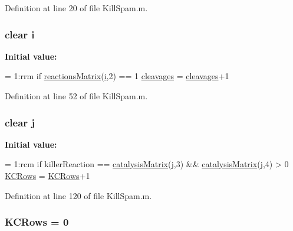 Definition at line 20 of file Kill\+Spam.\+m.

\hypertarget{a00029_ac870e1cd47f6d78f16a98a24c8392fcf}{
\subsubsection[{i}]{ clear i}}\label{a00029_ac870e1cd47f6d78f16a98a24c8392fcf}
{\bfseries Initial value\+:}
\begin{DoxyCode}
= 1:rrm
        \textcolor{keywordflow}{if} \hyperlink{a00029_ac52097a2745fcef31eb175d2e9485845}{reactionsMatrix}(\hyperlink{a00029_ac870e1cd47f6d78f16a98a24c8392fcf}{i},2) == 1
            \hyperlink{a00029_a89060c6979e5a4ff7b0985b35f295695}{cleavages} = \hyperlink{a00029_a89060c6979e5a4ff7b0985b35f295695}{cleavages}+1
\end{DoxyCode}


Definition at line 52 of file Kill\+Spam.\+m.

\hypertarget{a00029_ad34e9c7e9ae69ae0b9f1866faed5e4ad}{
\subsubsection[{j}]{\setlength{\rightskip}{0pt plus 5cm}clear j}}\label{a00029_ad34e9c7e9ae69ae0b9f1866faed5e4ad}
{\bfseries Initial value\+:}
\begin{DoxyCode}
= 1:rcm
                \textcolor{keywordflow}{if} killerReaction == \hyperlink{a00029_a0810027f58d6be965e44b7b84c44ace8}{catalysisMatrix}(\hyperlink{a00029_ad34e9c7e9ae69ae0b9f1866faed5e4ad}{j},3) && 
      \hyperlink{a00029_a0810027f58d6be965e44b7b84c44ace8}{catalysisMatrix}(\hyperlink{a00029_ad34e9c7e9ae69ae0b9f1866faed5e4ad}{j},4) > 0
                    \hyperlink{a00029_a62227634d3ceda9bf932c630583da2b9}{KCRows} = \hyperlink{a00029_a62227634d3ceda9bf932c630583da2b9}{KCRows}+1
\end{DoxyCode}


Definition at line 120 of file Kill\+Spam.\+m.

\hypertarget{a00029_a62227634d3ceda9bf932c630583da2b9}{
\subsubsection[{K\+C\+Rows}]{\setlength{\rightskip}{0pt plus 5cm}K\+C\+Rows = 0}}\label{a00029_a62227634d3ceda9bf932c630583da2b9}


